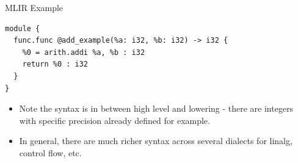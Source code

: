 \documentclass[aspectratio=169,11pt]{beamer}
\begin{document}
\begin{frame}[fragile]{MLIR Example}
	\begin{lstlisting}
module {
  func.func @add_example(%a: i32, %b: i32) -> i32 {
    %0 = arith.addi %a, %b : i32
    return %0 : i32
  }
}
  \end{lstlisting}

	\vspace{0.25cm}
	\begin{itemize}
		\item Note the syntax is in between high level and lowering - there are integers with
		      specific precision already defined for example.
		\item In general, there are much richer syntax across several dialects for linalg,
		      control flow, etc.
	\end{itemize}
\end{frame}
\end{document}
